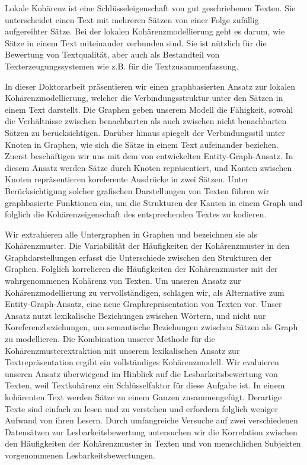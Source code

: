 \addchap*{\abstractname}

Lokale Kohärenz ist eine Schlüsseleigenschaft von gut geschriebenen Texten. 
Sie unterscheidet einen Text mit mehreren Sätzen von einer Folge zufällig aufgereihter Sätze. 
Bei der lokalen Kohärenzmodellierung geht es darum, wie Sätze in einem Text miteinander verbunden sind.
Sie ist nützlich für die Bewertung von Textqualität, aber auch als Bestandteil von Texterzeugungssystemen wie z.B. für die Textzusammenfassung.

In dieser Doktorarbeit präsentieren wir einen graphbasierten Ansatz zur lokalen Kohärenzmodellierung, welcher die Verbindungsstruktur unter den Sätzen in einem Text darstellt. 
Die Graphen geben unserem Modell die Fähigkeit, sowohl die Verhältnisse zwischen benachbarten als auch zwischen nicht benachbarten Sätzen zu berücksichtigen.
Darüber hinaus spiegelt der Verbindungsstil unter Knoten in Graphen, wie sich die Sätze in einem Text aufeinander beziehen. 
Zuerst beschäftigen wir uns mit dem von  entwickelten \mbox{Entity-Graph-Ansatz}.
In diesem Ansatz werden Sätze durch Knoten repräsentiert, und Kanten zwischen Knoten repräsentieren koreferente Ausdrücke in zwei Sätzen.
Unter Berücksichtigung solcher grafischen Darstellungen von Texten führen wir graphbasierte Funktionen ein, um die Strukturen der Kanten in einem Graph und folglich die Kohärenzeigenschaft des entsprechenden Textes zu kodieren. 

Wir extrahieren alle Untergraphen in Graphen und bezeichnen sie als Kohärenzmuster. 
Die Variabilität der Häufigkeiten der Kohärenzmuster in den Graphdarstellungen erfasst die Unterschiede zwischen den Strukturen der Graphen. 
Folglich korrelieren die Häufigkeiten der Kohärenzmuster mit der wahrgenommenen Kohärenz von Texten.
Um unseren Ansatz zur Kohärenzmodellierung zu vervollständigen, schlagen wir, als Alternative zum Entity-Graph-Ansatz, eine neue Graphrepräsentation von Texten vor. 
Unser Ansatz nutzt lexikalische Beziehungen zwischen Wörtern, und nicht nur Koreferenzbeziehungen, um semantische Beziehungen zwischen Sätzen als Graph zu modellieren. 
Die Kombination unserer Methode für die Kohärenzmusterextraktion mit unserem lexikalischen Ansatz zur Textrepräsentation ergibt ein vollständiges Kohärenzmodell.
Wir evaluieren unseren Ansatz überwiegend im Hinblick auf die Lesbarkeitsbewertung von Texten, weil Textkohärenz ein Schlüsselfaktor für diese Aufgabe ist. 
In einem kohärenten Text werden Sätze zu einem Ganzen zusammengefügt. 
Derartige Texte sind einfach zu lesen und zu verstehen und erfordern folglich weniger Aufwand von ihren Lesern.
Durch umfangreiche Versuche auf zwei verschiedenen Datensätzen zur Lesbarkeitsbewertung untersuchen wir die Korrelation zwischen den Häufigkeiten der Kohärenzmuster in
Texten und von menschlichen Subjekten vorgenommenen Lesbarkeitsbewertungen.

